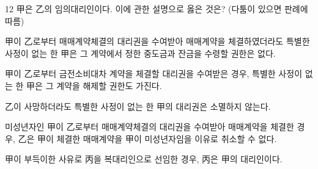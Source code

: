 \begin{question}{12}
甲은 乙의 임의대리인이다. 이에 관한 설명으로 옳은 것은? (다툼이 있으면 판례에 따름)
\begin{choices}
  \item 甲이 乙로부터 매매계약체결의 대리권을 수여받아 매매계약을 체결하였더라도 특별한 사정이 없는 한 甲은 그 계약에서 정한 중도금과 잔금을 수령할 권한은 없다.
  \item 甲이 乙로부터 금전소비대차 계약을 체결할 대리권을 수여받은 경우, 특별한 사정이 없는 한 甲은 그 계약을 해제할 권한도 가진다.
  \item 乙이 사망하더라도 특별한 사정이 없는 한 甲의 대리권은 소멸하지 않는다.
  \item 미성년자인 甲이 乙로부터 매매계약체결의 대리권을 수여받아 매매계약을 체결한 경우, 乙은 甲이 체결한 매매계약을 甲이 미성년자임을 이유로 취소할 수 없다.
  \item 甲이 부득이한 사유로 丙을 복대리인으로 선임한 경우, 丙은 甲의 대리인이다.
\end{choices}
\end{question}
